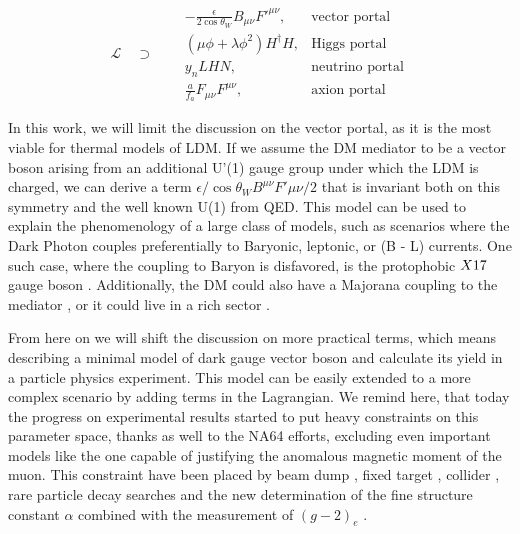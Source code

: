 \begin{equation}
  \label{eq:dm-portals}
  \mathcal{L} \quad \supset \quad
\begin{aligned}
  &-\frac{\epsilon}{2 \cos{\theta_W}}B_{\mu \nu}F'^{\mu \nu}, &\textrm{vector portal}\\
  & (\mu \phi + \lambda \phi^2)H^{\dagger}H, &\textrm{Higgs portal}\\
  &y_n LHN, &\textrm{neutrino portal} \\
  &\frac{a}{f_a} F_{\mu \nu} F^{\mu \nu}, &\textrm{axion portal}
\end{aligned}
\end{equation}

In this work, we will limit the discussion on the vector portal, as it is the most viable for thermal models of LDM. If we assume the DM mediator to be a vector boson arising from an additional U'(1) gauge group under which the LDM is charged, we can derive a term $\epsilon / \cos{\theta_W} B^{\mu \nu} F'{\mu \nu}/2$ that is invariant both on this symmetry and the well known U(1) from QED. This model can be used to explain the phenomenology of a large class of models, such as scenarios where the Dark Photon couples preferentially to Baryonic, leptonic, or (B - L) currents. One such case, where the coupling to Baryon is disfavored, is the protophobic $X17$ gauge boson \cite{PhysRevD.95.035017}. Additionally, the DM could also have a Majorana coupling to the mediator \cite{PhysRevD.93.063523}, or it could live in a rich sector \cite{Morrissey_2014}.

From here on we will shift the discussion on more practical terms, which means describing a minimal model of dark gauge vector boson and calculate its yield in a particle physics experiment. This model can be easily extended to a more complex scenario by adding terms in the Lagrangian. We remind here, that today the progress on experimental results started to put heavy constraints on this parameter space, thanks as well to the NA64 efforts, excluding even important models like the one capable of justifying the anomalous magnetic moment of the muon. This constraint have been placed by beam dump \cite{jdb, charm, PhysRevLett.59.755, e137, konaka, PhysRevLett.67.2942, dav,  ath, nomad, e787, essig1, blum,sg1, blum1, sarah1}, fixed target \cite{apex,merkel,merkel1}, collider \cite{babar, curt, babar1}, rare particle decay searches \cite{sindrum, kloe, sg2, kloe2, wasa, hades, phenix, e949, na48, pol, kloe3} and the new determination of the fine structure constant $\alpha$ combined with the measurement of $(g-2)_e$ \cite{Parker191,PhysRevLett.100.120801}.

